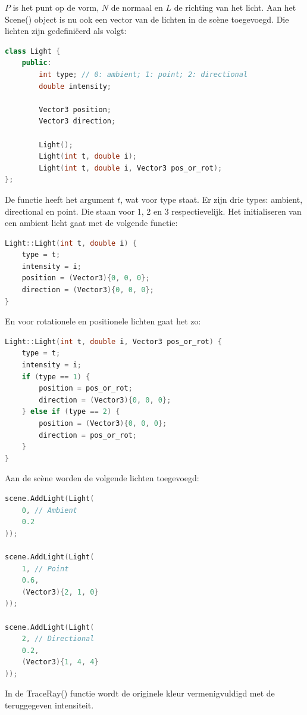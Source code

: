 \documentclass[12pt, a4paper]{article}
\begin{document}
$P$ is het punt op de vorm, $N$ de normaal en $L$ de richting van het licht. Aan het Scene() object is nu ook een vector van de lichten in de scène toegevoegd. Die lichten zijn gedefiniëerd als volgt:

\begin{lstlisting}[language=C++]
class Light {
    public:
        int type; // 0: ambient; 1: point; 2: directional
        double intensity;

        Vector3 position;
        Vector3 direction;

        Light();
        Light(int t, double i);
        Light(int t, double i, Vector3 pos_or_rot);
};
\end{lstlisting}

De functie heeft het argument $t$, wat voor type staat. Er zijn drie types: ambient, directional en point. Die staan voor 1, 2 en 3 respectievelijk. Het initialiseren van een ambient licht gaat met de volgende functie:

\begin{lstlisting}[language=C++]
Light::Light(int t, double i) {
    type = t;
    intensity = i;
    position = (Vector3){0, 0, 0};
    direction = (Vector3){0, 0, 0};
}
\end{lstlisting}

En voor rotationele en positionele lichten gaat het zo:

\begin{lstlisting}[language=C++]
Light::Light(int t, double i, Vector3 pos_or_rot) {
    type = t;
    intensity = i;
    if (type == 1) {
        position = pos_or_rot;
        direction = (Vector3){0, 0, 0};
    } else if (type == 2) {
        position = (Vector3){0, 0, 0};
        direction = pos_or_rot;
    }
}
\end{lstlisting}

Aan de scène worden de volgende lichten toegevoegd:

\begin{lstlisting}[language=C++]
scene.AddLight(Light(
    0, // Ambient
    0.2
));

scene.AddLight(Light(
    1, // Point
    0.6,
    (Vector3){2, 1, 0}
));

scene.AddLight(Light(
    2, // Directional
    0.2,
    (Vector3){1, 4, 4}
));
\end{lstlisting}

In de TraceRay() functie wordt de originele kleur vermenigvuldigd met de teruggegeven intensiteit. 
\end{document}
